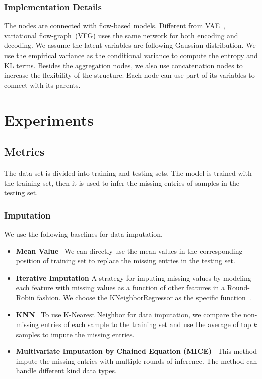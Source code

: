 \documentclass[conference]{IEEEtran}
\begin{document}
\subsubsection{Implementation Details}

The nodes are connected with flow-based models. Different from VAE~\cite{kingma2013auto}, variational flow-graph~(VFG) uses the same network for both encoding and decoding. We assume the latent variables are following Gaussian distribution. We use the empirical variance as the conditional variance to compute the entropy and KL terms. Besides the aggregation nodes, we also use concatenation nodes to increase the flexibility of the structure. Each node can use part of its variables to connect with its parents. 


\section{Experiments}

\subsection{Metrics}
The data set is divided into training and testing sets. The model is trained with the training set, then it is used to infer the missing entries of samples in the testing set.

\subsubsection{Imputation}

We use the following baselines for data imputation.

\begin{itemize}
\item \textbf{Mean Value} \ We can directly use the mean values in the corresponding position of training set to replace the missing entries in the testing set.  

\item \textbf{Iterative Imputation} A strategy for imputing missing values by modeling each feature with missing values as a function of other features in a Round-Robin fashion. We choose the KNeighborRegressor as the specific function~\cite{scikit-learn}.

\item \textbf{KNN} \  To use K-Nearest Neighbor for data imputation,  we compare the non-missing entries of each sample to the training set and use the  average of top $k$ samples to impute the missing entries. 

\item \textbf{Multivariate Imputation by Chained Equation (MICE)} \ This method impute the missing entries with multiple  rounds of inference. The method can handle different kind data types.
\end{itemize}
\end{document}
